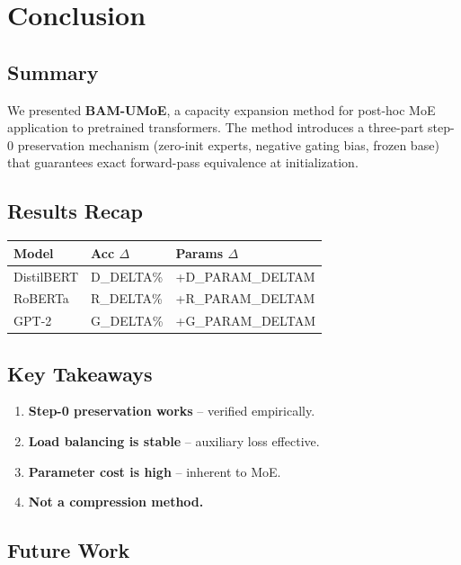 \section{Conclusion}

\subsection{Summary}

We presented \textbf{BAM-UMoE}, a capacity expansion method for post-hoc MoE 
application to pretrained transformers. The method introduces a three-part 
step-0 preservation mechanism (zero-init experts, negative gating bias, 
frozen base) that guarantees exact forward-pass equivalence at 
initialization.

\subsection{Results Recap}

\begin{table}[H]
\centering
\small
\begin{tabular}{lll}
\toprule
\textbf{Model} & \textbf{Acc $\Delta$} & \textbf{Params $\Delta$} \\
\midrule
DistilBERT & {{D\_DELTA}}\% & +{{D\_PARAM\_DELTA}}M \\
RoBERTa & {{R\_DELTA}}\% & +{{R\_PARAM\_DELTA}}M \\
GPT-2 & {{G\_DELTA}}\% & +{{G\_PARAM\_DELTA}}M \\
\bottomrule
\end{tabular}
\end{table}

\subsection{Key Takeaways}

\begin{enumerate}
\item \textbf{Step-0 preservation works} -- verified empirically.
\item \textbf{Load balancing is stable} -- auxiliary loss effective.
\item \textbf{Parameter cost is high} -- inherent to MoE.
\item \textbf{Not a compression method.}

\end{enumerate}
\subsection{Future Work}

